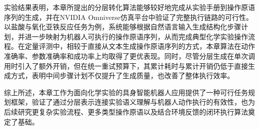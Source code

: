 实验结果表明，本章所提出的分层转化算法能够较好地完成从实验手册到操作原语序列的生成，并在NVIDIA Omniverse仿真平台中验证了完整执行链路的可行性。以盐酸与氧化亚铁反应任务为例，系统能够根据自然语言输入生成结构化步骤计划，并进一步映射为机器人可执行的操作原语序列，从而完成典型化学实验操作流程。在定量评测中，相较于直接从文本生成操作原语序列的方式，本章算法在动作准确率、参数准确率和成功率上均取得了更优表现。同时，尽管分层生成在单次调用时引入了额外开销，但在统一重试预算下，其累计耗时与累计开销仍低于直接生成方式，表明中间步骤计划不仅提升了生成质量，也改善了整体执行效率。

综上所述，本章工作为面向化学实验的具身智能机器人应用提供了一种可行任务规划框架，验证了通过分层表示连接实验语义理解与机器人动作执行的有效性，也为后续研究更复杂实验流程、更多类型操作原语以及结合环境反馈的闭环执行算法奠定了基础。
